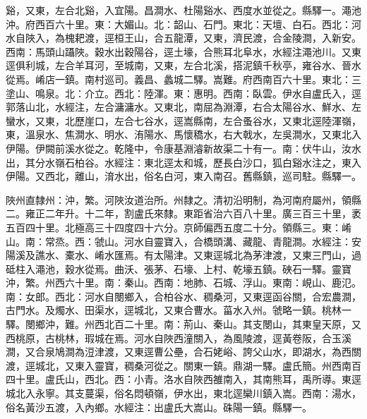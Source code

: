 \begin{pinyinscope}
谿，又東，左合北谿，入宜陽。昌澗水、杜陽谿水、西度水並從之。縣驛一。澠池沖。府西百六十里。東：大媚山。北：韶山、石門。東北：天壇、白石。西北：河水自陜入，為槐耙渡，逕桓王山，合五龍潭，又東，濟民渡，合金陵澗，入新安。西南：馬頭山躡陜。穀水出穀陽谷，逕土壕，合熊耳北阜水，水經注澠池川。又東逕俱利城，左合羊耳河，至城南，又東，左合北溪，搭泥鎮千秋亭，雍谷水、晉水從焉。崤店一鎮。南村巡司。義昌、蠡城二驛。嵩難。府西南百六十里。東北：三塗山、鳴泉。北：介立。西北：陸渾。東：惠明。西南：臥雲。伊水自盧氏入，逕郭落山北，水經注，左合滽滽水。又東北，南屈為淵潭，右合太陽谷水、鮮水、左蠻水，又東，北歷崖口，左合七谷水，逕嵩縣南，左合蚤谷水，又東北逕陸渾嶺，東，溫泉水、焦澗水、明水、洧陽水、馬懷穚水，右大戟水，左吳澗水，又東北入伊陽。伊闕前溪水從之。乾隆中，令康基淵濬新故渠二十有一。南：伏牛山，汝水出，其分水嶺石柏谷。水經注：東北逕太和城，歷長白沙口，狐白谿水注之，東入伊陽。又西北，離山，淯水出，俗名白河，東入南召。舊縣鎮，巡司駐。縣驛一。

陜州直隸州：沖，繁。河陜汝道治所。州隸之。清初沿明制，為河南府屬州，領縣二。雍正二年升。十二年，割盧氏來隸。東距省治六百八十里。廣三百三十里，袤五百四十里。北極高三十四度四十六分。京師偏西五度二十分。領縣三。東：崤山。南：常烝。西：虢山。河水自靈寶入，合橋頭溝、藏龍、青龍澗。水經注：安陽溪及譙水、橐水、崤水匯焉。有太陽津。又東逕城北為茅津渡，又東三門山，過砥柱入澠池，穀水從焉。曲沃、張茅、石壕、上村、乾壕五鎮。硤石一驛。靈寶沖，繁。州西六十里。南：秦山。西南：地肺、石城、浮山。東南：峴山、鹿氾。南：女郎。西北：河水自閿鄉入，合柏谷水、稠桑河，又東逕函谷關，合宏農澗，古門水。及燭水、田渠水，逕城北，又東合曹水。菑水入州。虢略一鎮。桃林一驛。閿鄉沖，難。州西北百二十里。南：荊山、秦山。其支閿山，其東皇天原，又西桃原，古桃林，瑕城在焉。河水自陜西潼關入，為風陵渡，逕黃卷阪，合玉溪澗，又合泉鳩澗為浢津渡，又東逕曹公壘，合石姥峪、誇父山水，即湖水，為西關渡，逕城北，又東入靈寶，稠桑河從之。關東一鎮。鼎湖一驛。盧氏簡。州西南百四十里。盧氏山，西北。西：小青。洛水自陜西雒南入，其南熊耳，禹所導。東逕城北入永寧。其支蔓渠，俗名悶頓嶺，伊水出，東北逕欒川鎮入嵩。西南：湯水，俗名黃沙五渡，入內鄉。水經注：出盧氏大嵩山。硃陽一鎮。縣驛一。


\end{pinyinscope}
